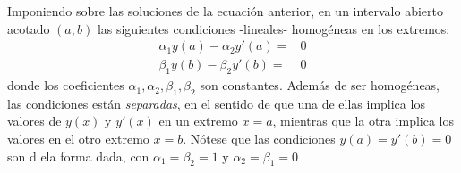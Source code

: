 \begin{frame}
Imponiendo sobre las soluciones de la ecuaci\'{o}n anterior, en un intervalo abierto acotado $(a,b)$ las siguientes condiciones -lineales- homog\'{e}neas en los extremos:
\[ \begin{split}
\alpha_{1} y(a) - \alpha_{2} y'(a) =& 0 \\
\beta_{1} y(b) - \beta_{2} y'(b) =& 0
\end{split} \]
donde los coeficientes $\alpha_{1},\alpha_{2},\beta_{1},\beta_{2}$ son constantes. Adem\'{a}s de ser homog\'{e}neas, las condiciones est\'{a}n \textit{separadas}, en el sentido de que una de ellas implica los valores de $y(x)$ y $y'(x)$ en un extremo $x=a$, mientras que la otra implica los valores en el otro extremo $x=b$. N\'{o}tese que las condiciones $y(a)=y'(b)=0$ son d ela forma dada, con $\alpha_{1}=\beta_{2}=1$ y $\alpha_{2}=\beta_{1}=0$
\end{frame}
